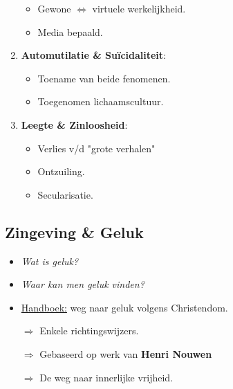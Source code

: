 \begin{enumerate}
\begin{itemize}
		\item Gewone $\Leftrightarrow$ virtuele werkelijkheid.
		\item Media bepaald.
	\end{itemize}
	\item \textbf{Automutilatie \& Su\"icidaliteit}:
	\begin{itemize}
		\item Toename van beide fenomenen.
		\item Toegenomen lichaamscultuur.
	\end{itemize}
	\item \textbf{Leegte \& Zinloosheid}:
	\begin{itemize}
		\item Verlies v/d "grote verhalen"
		\item Ontzuiling.
		\item Secularisatie.
	\end{itemize}
\end{enumerate}

\subsection*{Zingeving \& Geluk}
\begin{itemize}
	\item \textit{Wat is geluk?}
	\item \textit{Waar kan men geluk vinden?}
	\item \underline{Handboek:} weg naar geluk volgens Christendom.
	\item[$\Rightarrow$] Enkele richtingswijzers.
	\item[$\Rightarrow$] Gebaseerd op werk van \textbf{Henri Nouwen}
	\item[$\Rightarrow$] De weg naar innerlijke vrijheid.
\end{itemize}

